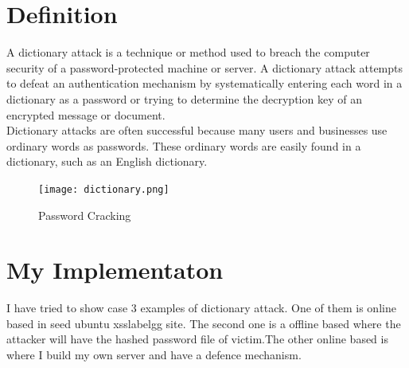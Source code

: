 \documentclass[11pt, english]{article}
\begin{document}
\newcommand{\CC}{C\nolinebreak\hspace{-.05em}\raisebox{.4ex}{\tiny\bf +}\nolinebreak\hspace{-.10em}\raisebox{.4ex}{\tiny\bf +}}
\def\CC{{C\nolinebreak[4]\hspace{-.05em}\raisebox{.4ex}{\tiny\bf ++}}}

\tableofcontents
\newpage
\section{Definition}
A dictionary attack is a technique or method used to breach the computer security of a password-protected machine or server. A dictionary attack attempts to defeat an authentication mechanism by systematically entering each word in a dictionary as a password or trying to determine the decryption key of an encrypted message or document.  \\

Dictionary attacks are often successful because many users and businesses use ordinary words as passwords. These ordinary words are easily found in a dictionary, such as an English dictionary. \\
\begin{figure}[h!]
        \begin{minipage}[b]{1\linewidth}
        \centering
        \texttt{[image: dictionary.png]} \label{Password Cracking}
        \caption{Password Cracking}
        \end{minipage}
\end{figure}
\section{My Implementaton}
 I have tried to show case 3 examples of dictionary attack. One of them is online based in seed ubuntu xsslabelgg site. The second one is a offline based where the attacker will have the hashed password file of victim.The other online based is where I build my own server and have a defence mechanism.\\
\end{document}
